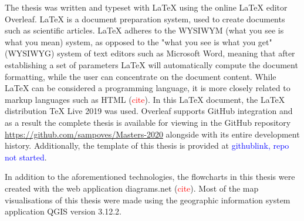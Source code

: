 The thesis was written and typeset with LaTeX using the online LaTeX editor Overleaf. LaTeX is a document preparation system, used to create documents such as scientific articles. LaTeX adheres to the WYSIWYM (what you see is what you mean) system, as opposed to the "what you see is what you get" (WYSIWYG) system of text editors such as Microsoft Word, meaning that after establishing a set of parameters LaTeX will automatically compute the document formatting, while the user can concentrate on the document content. While LaTeX can be considered a programming language, it is more closely related to markup languages such as HTML (\textcolor{red}{cite}). In this LaTeX document, the LaTeX distribution TeX Live 2019 was used. Overleaf supports GitHub integration and as a result the complete thesis is available for viewing in the GitHub repository \textcolor{blue}{\url{https://github.com/sampoves/Masters-2020}} alongside with its entire development history. Additionally, the template of this thesis is provided at \textcolor{blue}{githublink, repo not started}.

In addition to the aforementioned technologies, the flowcharts in this thesis were created with the web application diagrams.net (\textcolor{red}{cite}). Most of the map visualisations of this thesis were made using the geographic information system application QGIS version 3.12.2.

